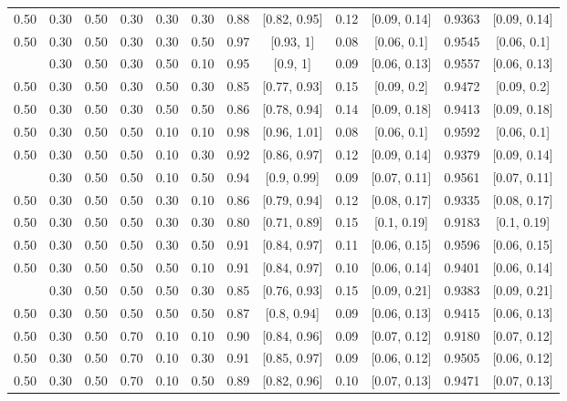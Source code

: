 \documentclass[
  11pt,
]{article}
\begin{document}
\begin{landscape}
\begin{ThreePartTable}
\begin{longtable}[t]{cccccccccccc}
0.50 & 0.30 & 0.50 & 0.30 & 0.30 & 0.30 & 0.88 & {}[0.82, 0.95] & 0.12 & {}[0.09, 0.14] & 0.9363 & {}[0.09, 0.14]\\
0.50 & 0.30 & 0.50 & 0.30 & 0.30 & 0.50 & 0.97 & {}[0.93, 1] & 0.08 & {}[0.06, 0.1] & 0.9545 & {}[0.06, 0.1]\\
\addlinespace
0.50 & 0.30 & 0.50 & 0.30 & 0.50 & 0.10 & 0.95 & {}[0.9, 1] & 0.09 & {}[0.06, 0.13] & 0.9557 & {}[0.06, 0.13]\\
0.50 & 0.30 & 0.50 & 0.30 & 0.50 & 0.30 & 0.85 & {}[0.77, 0.93] & 0.15 & {}[0.09, 0.2] & 0.9472 & {}[0.09, 0.2]\\
0.50 & 0.30 & 0.50 & 0.30 & 0.50 & 0.50 & 0.86 & {}[0.78, 0.94] & 0.14 & {}[0.09, 0.18] & 0.9413 & {}[0.09, 0.18]\\
0.50 & 0.30 & 0.50 & 0.50 & 0.10 & 0.10 & 0.98 & {}[0.96, 1.01] & 0.08 & {}[0.06, 0.1] & 0.9592 & {}[0.06, 0.1]\\
0.50 & 0.30 & 0.50 & 0.50 & 0.10 & 0.30 & 0.92 & {}[0.86, 0.97] & 0.12 & {}[0.09, 0.14] & 0.9379 & {}[0.09, 0.14]\\
\addlinespace
0.50 & 0.30 & 0.50 & 0.50 & 0.10 & 0.50 & 0.94 & {}[0.9, 0.99] & 0.09 & {}[0.07, 0.11] & 0.9561 & {}[0.07, 0.11]\\
0.50 & 0.30 & 0.50 & 0.50 & 0.30 & 0.10 & 0.86 & {}[0.79, 0.94] & 0.12 & {}[0.08, 0.17] & 0.9335 & {}[0.08, 0.17]\\
0.50 & 0.30 & 0.50 & 0.50 & 0.30 & 0.30 & 0.80 & {}[0.71, 0.89] & 0.15 & {}[0.1, 0.19] & 0.9183 & {}[0.1, 0.19]\\
0.50 & 0.30 & 0.50 & 0.50 & 0.30 & 0.50 & 0.91 & {}[0.84, 0.97] & 0.11 & {}[0.06, 0.15] & 0.9596 & {}[0.06, 0.15]\\
0.50 & 0.30 & 0.50 & 0.50 & 0.50 & 0.10 & 0.91 & {}[0.84, 0.97] & 0.10 & {}[0.06, 0.14] & 0.9401 & {}[0.06, 0.14]\\
\addlinespace
0.50 & 0.30 & 0.50 & 0.50 & 0.50 & 0.30 & 0.85 & {}[0.76, 0.93] & 0.15 & {}[0.09, 0.21] & 0.9383 & {}[0.09, 0.21]\\
0.50 & 0.30 & 0.50 & 0.50 & 0.50 & 0.50 & 0.87 & {}[0.8, 0.94] & 0.09 & {}[0.06, 0.13] & 0.9415 & {}[0.06, 0.13]\\
0.50 & 0.30 & 0.50 & 0.70 & 0.10 & 0.10 & 0.90 & {}[0.84, 0.96] & 0.09 & {}[0.07, 0.12] & 0.9180 & {}[0.07, 0.12]\\
0.50 & 0.30 & 0.50 & 0.70 & 0.10 & 0.30 & 0.91 & {}[0.85, 0.97] & 0.09 & {}[0.06, 0.12] & 0.9505 & {}[0.06, 0.12]\\
0.50 & 0.30 & 0.50 & 0.70 & 0.10 & 0.50 & 0.89 & {}[0.82, 0.96] & 0.10 & {}[0.07, 0.13] & 0.9471 & {}[0.07, 0.13]\\

\end{longtable}
\end{ThreePartTable}
\end{landscape}
\end{document}
